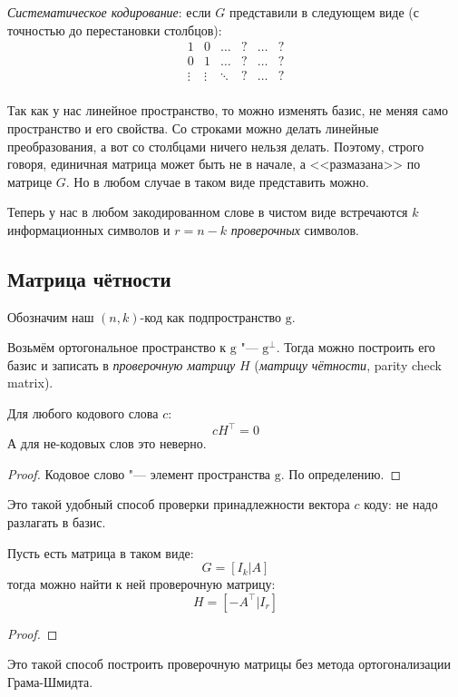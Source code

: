 \begin{Def}
	\textit{Систематическое кодирование}:
	если $G$ представили в следующем виде (с точностью до перестановки столбцов):
	\[
	\begin{array}{ccc|ccc}
		1 & 0 & \dots & ? & \dots & ? \\
		0 & 1 & \dots & ? & \dots & ? \\
		\vdots & \vdots & \ddots & ? & \dots & ? \\
	\end{array}
	\]
\end{Def}
\begin{Rem}
	Так как у нас линейное пространство, то можно изменять базис,
	не меняя само пространство и его свойства.
	Со строками можно делать линейные преобразования,
	а вот со столбцами ничего нельзя делать.
	Поэтому, строго говоря, единичная матрица может быть не в начале,
	а <<размазана>> по матрице $G$.
	Но в любом случае в таком виде представить можно.
\end{Rem}
\begin{Def}
	Теперь у нас в любом закодированном слове
	в чистом виде встречаются $k$ информационных символов
	и $r=n-k$ \textit{проверочных} символов.
\end{Def}

\subsection{Матрица чётности}
Обозначим наш $(n, k)$-код как подпространство $\mathrm g$.

\begin{Def}
Возьмём ортогональное пространство к $\mathrm g$ "--- $\mathrm g^{\bot}$.
Тогда можно построить его базис и записать в \textit{проверочную матрицу} $H$
(\textit{матрицу чётности}, parity check matrix).
\end{Def}
\begin{lemma}
	Для любого кодового слова $c$:
	\[
		c H^\top = 0
	\]
	А для не-кодовых слов это неверно.
\end{lemma}
\begin{proof}
	Кодовое слово "--- элемент пространства $\mathrm g$.
	По определению.
	\TODO
\end{proof}
\begin{Rem}
	Это такой удобный способ проверки принадлежности вектора $c$
	коду: не надо разлагать в базис.
\end{Rem}

\begin{lemma}
	Пусть есть матрица в таком виде:
	\[
		G = [ I_k | A ]
	\]
	тогда можно найти к ней проверочную матрицу:
	\[
		H = [ -A^\top | I_r ]
	\]
\end{lemma}
\begin{proof}
	\TODO
\end{proof}
\begin{Rem}
	Это такой способ построить проверочную матрицы
	без метода ортогонализации Грама-Шмидта.
\end{Rem}

